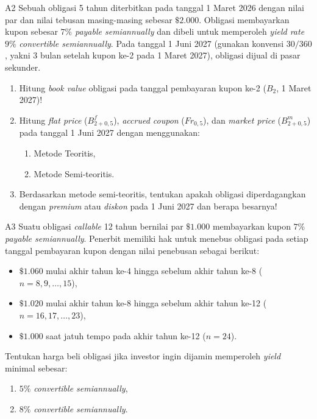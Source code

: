 \documentclass[11pt,a4paper]{article}
\begin{document}
\begin{naskahsoalbox}{A2}
Sebuah obligasi 5 tahun diterbitkan pada tanggal 1 Maret 2026 dengan nilai par dan nilai tebusan masing-masing sebesar $\$2.000$. Obligasi membayarkan kupon sebesar $7\%$ \textit{payable semiannually} dan dibeli untuk memperoleh \textit{yield rate} $9\%$ \textit{convertible semiannually}. Pada tanggal 1 Juni 2027 (gunakan konvensi $30/360$, yakni 3 bulan setelah kupon ke-2 pada 1 Maret 2027), obligasi dijual di pasar sekunder.
\begin{enumerate}[label=(\alph*), leftmargin=6mm, topsep=1pt, itemsep=1.5pt]
    \item Hitung \textit{book value} obligasi pada tanggal pembayaran kupon ke-2 ($B_2$, 1 Maret 2027)!
    \item Hitung \textit{flat price} ($B_{2+0{,}5}^f$), \textit{accrued coupon} ($Fr_{0{,}5}$), dan \textit{market price} ($B_{2+0{,}5}^m$) pada tanggal 1 Juni 2027 dengan menggunakan:
    \begin{enumerate}[label=(\roman*), leftmargin=6mm, topsep=1pt, itemsep=1pt]
        \item Metode Teoritis,
        \item Metode Semi-teoritis.
    \end{enumerate}
    \item Berdasarkan metode semi-teoritis, tentukan apakah obligasi diperdagangkan dengan \textit{premium} atau \textit{diskon} pada 1 Juni 2027 dan berapa besarnya!
\end{enumerate}
\end{naskahsoalbox}

\begin{naskahsoalbox}{A3}
Suatu obligasi \textit{callable} 12 tahun bernilai par $\$1.000$ membayarkan kupon $7\%$ \textit{payable semiannually}. Penerbit memiliki hak untuk menebus obligasi pada setiap tanggal pembayaran kupon dengan nilai penebusan sebagai berikut:
\begin{itemize}[leftmargin=6mm, topsep=1pt, itemsep=1pt]
    \item $\$1.060$ mulai akhir tahun ke-4 hingga sebelum akhir tahun ke-8 ($n = 8, 9, \dots, 15$),
    \item $\$1.020$ mulai akhir tahun ke-8 hingga sebelum akhir tahun ke-12 ($n = 16, 17, \dots, 23$),
    \item $\$1.000$ saat jatuh tempo pada akhir tahun ke-12 ($n = 24$).
\end{itemize}
Tentukan harga beli obligasi jika investor ingin dijamin memperoleh \textit{yield} minimal sebesar:
\begin{enumerate}[label=(\alph*), leftmargin=6mm, topsep=1pt, itemsep=1pt]
    \item $5\%$ \textit{convertible semiannually},
    \item $8\%$ \textit{convertible semiannually}.
\end{enumerate}
\end{naskahsoalbox}
\end{document}
